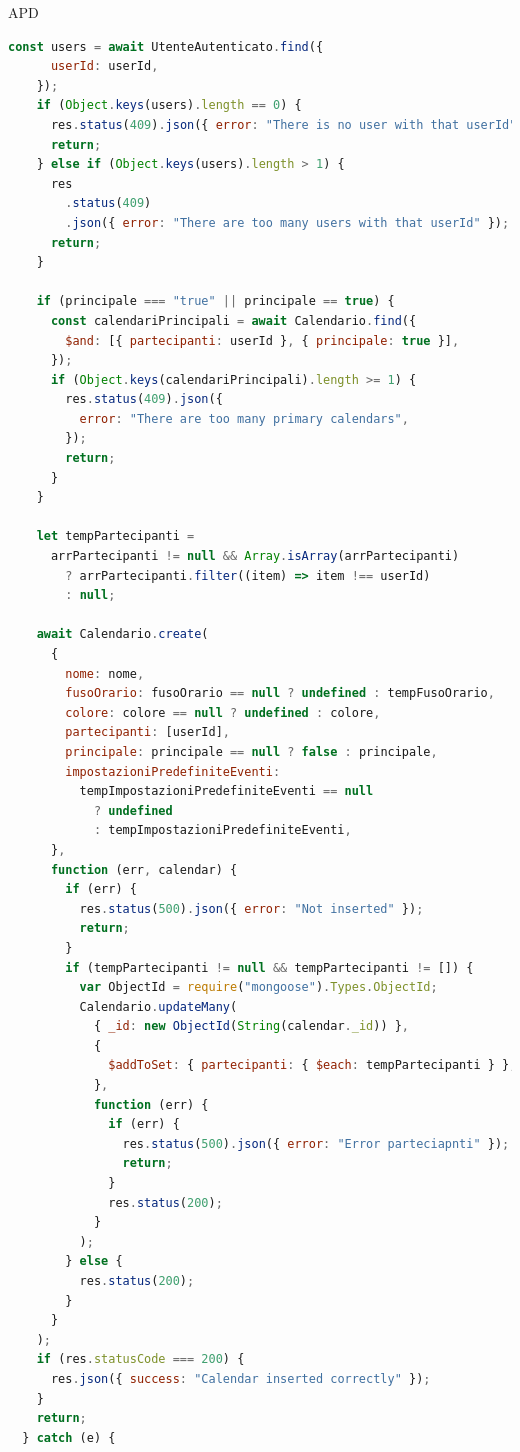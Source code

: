 \begin{listaPersonale} {APD}
\begin{listaPersonale2}[APD]{}
\begin{lstlisting}[language=JavaScript]
    const users = await UtenteAutenticato.find({
      userId: userId,
    });
    if (Object.keys(users).length == 0) {
      res.status(409).json({ error: "There is no user with that userId" });
      return;
    } else if (Object.keys(users).length > 1) {
      res
        .status(409)
        .json({ error: "There are too many users with that userId" });
      return;
    }

    if (principale === "true" || principale == true) {
      const calendariPrincipali = await Calendario.find({
        $and: [{ partecipanti: userId }, { principale: true }],
      });
      if (Object.keys(calendariPrincipali).length >= 1) {
        res.status(409).json({
          error: "There are too many primary calendars",
        });
        return;
      }
    }

    let tempPartecipanti =
      arrPartecipanti != null && Array.isArray(arrPartecipanti)
        ? arrPartecipanti.filter((item) => item !== userId)
        : null;

    await Calendario.create(
      {
        nome: nome,
        fusoOrario: fusoOrario == null ? undefined : tempFusoOrario,
        colore: colore == null ? undefined : colore,
        partecipanti: [userId],
        principale: principale == null ? false : principale,
        impostazioniPredefiniteEventi:
          tempImpostazioniPredefiniteEventi == null
            ? undefined
            : tempImpostazioniPredefiniteEventi,
      },
      function (err, calendar) {
        if (err) {
          res.status(500).json({ error: "Not inserted" });
          return;
        }
        if (tempPartecipanti != null && tempPartecipanti != []) {
          var ObjectId = require("mongoose").Types.ObjectId;
          Calendario.updateMany(
            { _id: new ObjectId(String(calendar._id)) },
            {
              $addToSet: { partecipanti: { $each: tempPartecipanti } },
            },
            function (err) {
              if (err) {
                res.status(500).json({ error: "Error parteciapnti" });
                return;
              }
              res.status(200);
            }
          );
        } else {
          res.status(200);
        }
      }
    );
    if (res.statusCode === 200) {
      res.json({ success: "Calendar inserted correctly" });
    }
    return;
  } catch (e) {
    

\end{lstlisting}
\end{listaPersonale2}
\end{listaPersonale}
